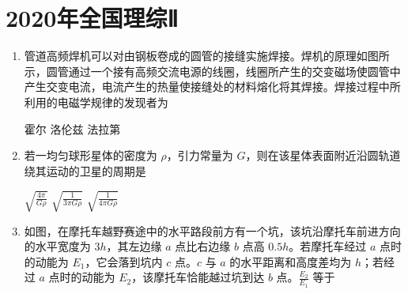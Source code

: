 \documentclass[\gkver]{gaokaozhenti}
\begin{document}
\chapter{2020年全国理综Ⅱ}

\begin{enumerate}
\item
管道高频焊机可以对由钢板卷成的圆管的接缝实施焊接。焊机的原理如图所示，圆管通过一个接有高频交流电源的线圈，线圈所产生的交变磁场使圆管中产生交变电流，电流产生的热量使接缝处的材料熔化将其焊接。焊接过程中所利用的电磁学规律的发现者为


{霍尔}
{洛伦兹}
{法拉第}

\item
若一均匀球形星体的密度为 $\rho$，引力常量为 $G$，则在该星体表面附近沿圆轨道绕其运动的卫星的周期是

{$\sqrt{\frac{4\pi}{G\rho}}$}
{$\sqrt{\frac{1}{3\pi G\rho}}$}
{$\sqrt{\frac{1}{4\pi G\rho}}$}

\item
如图，在摩托车越野赛途中的水平路段前方有一个坑，该坑沿摩托车前进方向的水平宽度为 $3h$，其左边缘 $a$ 点比右边缘 $b$ 点高 $0.5h$。若摩托车经过 $a$ 点时的动能为 $E_{1}$，它会落到坑内 $c$ 点。$c$ 与 $a$ 的水平距离和高度差均为 $h$；若经过 $a$ 点时的动能为 $E_{2}$，该摩托车恰能越过坑到达 $b$ 点。$\frac{E_{2}}{E_{1}}$ 等于


\end{enumerate}
\end{document}
